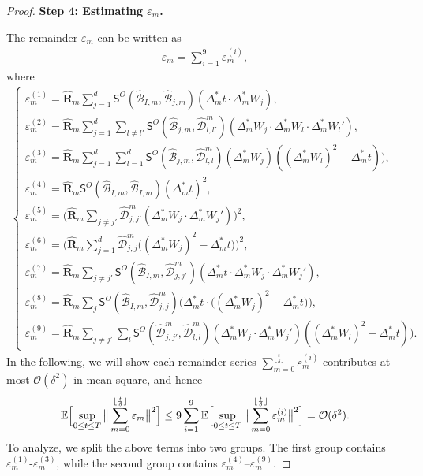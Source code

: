 \documentclass[11pt, a4paper, onecolumn]{article}
\newcommand{\E}{\mathbb{E}}
\newcommand{\m}{m}
\newcommand{\SSO}{\nm S^{O}}
\newcommand{\bfR}{\mathbf{R}}
\newcommand{\B}{\mathcal{B}}
\newcommand{\hatB}{\widehat{\B}}
\newcommand{\hatR}{\widehat{\bfR}}
\newcommand{\hatD}{\widehat{\tg D}}
\newcommand{\tg}[1]{\mathcal{#1}}
\newcommand{\nm}[1]{\mathsf{#1}}
\newcommand{\hBIms}{{\hatB_{I,\m}}}
\newcommand{\hBjms}{{\hatB_{j,\m}}}
\newcommand{\Dms}{{\Delta^{*}_{m}}}
\newcommand{\hDjjms}{ {\hatD_{j,j}^{\m}} }
\newcommand{\hDjjpms}{ {\hatD_{j,j'}^{\m}} }
\newcommand{\hDllms}{ {\hatD_{l,l}^{\m}} }
\newcommand{\hDllpms}{ {\hatD_{l,l'}^{\m}} }
\newcommand{\sumub}{{\lfloor \frac{t}{\delta} \rfloor}}
\newcommand{\hRms}{{\hatR_\m}}
\newcommand{\ermn}[1]{\varepsilon_m^{(#1)}}
\newcommand{\EsupN}[1]{\E\Bigl[ \sup_{0 \le t\le T} \big\| \sum_{m=0}^{\sumub} #1 \big\|^2 \Bigr]}
\begin{document}
\begin{appendices}
\begin{proof}
\noindent\textbf{Step 4: Estimating $\varepsilon_m$.} 


The remainder $\varepsilon_m$ can be written as 
\begin{align*}
    \varepsilon_m = \sum_{i = 1}^{9}\ermn{i},
\end{align*}
where
\begin{align}\label{eq:vare-expansion}
    \begin{cases}
        \ermn{1} = \hatR_m\sum_{j=1}^d \SSO(\hBIms, \hBjms) (\Dms t \cdot \Dms W_j), \\
        \ermn{2} = \hatR_m\sum_{j=1}^d\sum_{l\neq l'}  \SSO(\hBjms ,\hDllpms) (\Dms W_j \cdot \Dms W_l \cdot \Dms W_l'), \\
        \ermn{3} = \hatR_m\sum_{j=1}^d\sum_{l=1}^d \SSO (\hBjms, \hDllms)(\Dms W_j) ( (\Dms W_l)^2 - \Dms t)),\\
        \ermn{4} = \hatR_m \SSO(\hBIms,\hBIms) (\Dms t)^2,  \\
        \ermn{5} = \Big( \hatR_m \sum_{j\neq j'}  \hDjjpms  (\Dms W_j \cdot \Dms W_j')\Big)^2,  \\
        \ermn{6} = \Big( \hatR_m \sum_{j=1}^d\hDjjms \big( (\Dms W_j)^2 - \Dms t \big) \Big)^2, \\
        \ermn{7} = \hatR_m\sum_{j\neq j'}  \SSO(\hBIms, \hDjjpms) (\Dms t \cdot \Dms W_j \cdot \Dms W_j'), \\
        \ermn{8} = \hRms  \sum_{j} \SSO(\hBIms, \hDjjms) \Big(\Dms t \cdot \big((\Dms W_j)^2 - \Dms t\big)\Big), \\
        \ermn{9} = \hatR_m \sum_{j\neq j'} \sum_{l} \SSO( \hDjjpms, \hDllms) (\Dms W_j \cdot \Dms W_j')((\Dms W_l)^2 - \Dms t)).
    \end{cases}
\end{align}
In the following, we will show each remainder series  $ \sum_{m=0}^{\sumub} \ermn{i}  $ contributes at most $\mathcal O(\delta^{2})$ in mean square, and hence
\begin{align*}
    \EsupN{ \varepsilon_m} \le 9 \sum_{i=1}^9  \EsupN{\ermn{i}} = \mathcal O(\delta^{2}).
\end{align*}
To analyze, we split the above terms into two groups. The first group contains $\ermn{1}$-$\ermn{3}$, while the second group contains $\varepsilon_{m}^{(4)}$–$\varepsilon_{m}^{(9)}$.


\end{proof}
\end{appendices}
\end{document}

